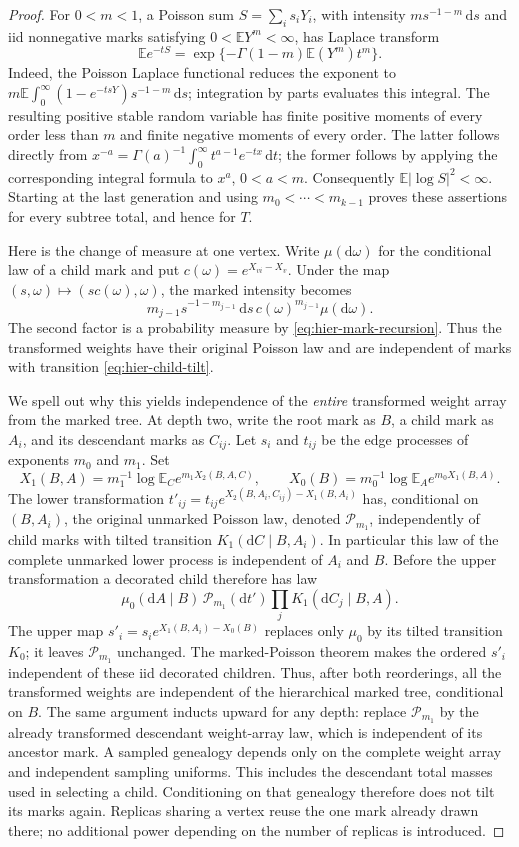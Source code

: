 \documentclass[11pt,a4paper]{article}
\numberwithin{equation}{section}
\theoremstyle{definition}
\theoremstyle{remark}
\newcommand{\E}{\mathbb E}
\newcommand{\dd}{\mathrm d}
\begin{document}
\begin{proof}
For $0<m<1$, a Poisson sum $S=\sum_i s_iY_i$, with intensity
$m s^{-1-m}\,\dd s$ and iid nonnegative marks satisfying
$0<\E Y^m<\infty$, has Laplace transform
\[
 \E e^{-tS}
 =\exp\{-\Gamma(1-m)\E(Y^m)t^m\}.
\]
Indeed, the Poisson Laplace functional reduces the exponent to
$m\E\int_0^\infty(1-e^{-tsY})s^{-1-m}\,\dd s$; integration by parts evaluates
this integral.  The resulting positive stable random variable has finite
positive moments of every order less than $m$ and finite negative moments
of every order.  The latter follows directly from
$x^{-a}=\Gamma(a)^{-1}\int_0^\infty t^{a-1}e^{-tx}\,\dd t$; the former follows
by applying the corresponding integral formula to $x^a$, $0<a<m$.
Consequently $\E|\log S|^2<\infty$.  Starting at the last generation and
using $m_0<\cdots<m_{k-1}$ proves these assertions for every subtree total,
and hence for $T$.

Here is the change of measure at one vertex.  Write $\mu(\dd\omega)$ for
the conditional law of a child mark and put $c(\omega)=e^{X_{vi}-X_v}$.
Under the map $(s,\omega)\mapsto(sc(\omega),\omega)$, the marked intensity
becomes
\[
 m_{j-1}s^{-1-m_{j-1}}\,\dd s\,
 c(\omega)^{m_{j-1}}\mu(\dd\omega).
\]
The second factor is a probability measure by
\eqref{eq:hier-mark-recursion}.  Thus the transformed weights have their
original Poisson law and are independent of marks with transition
\eqref{eq:hier-child-tilt}.

We spell out why this yields independence of the \emph{entire} transformed
weight array from the marked tree.  At depth two, write the root mark as
$B$, a child mark as $A_i$, and its descendant marks as $C_{ij}$.  Let $s_i$
and $t_{ij}$ be the edge processes of exponents $m_0$ and $m_1$.  Set
\[
 X_1(B,A)=m_1^{-1}\log\E_C e^{m_1X_2(B,A,C)},\qquad
 X_0(B)=m_0^{-1}\log\E_A e^{m_0X_1(B,A)}.
\]
The lower transformation
$t'_{ij}=t_{ij}e^{X_2(B,A_i,C_{ij})-X_1(B,A_i)}$ has, conditional on
$(B,A_i)$, the original unmarked Poisson law, denoted $\mathcal P_{m_1}$,
independently of child marks with tilted transition $K_1(\dd C\mid B,A_i)$.
In particular this law of the complete unmarked lower process is
independent of $A_i$ and $B$.  Before the upper transformation a decorated
child therefore has law
\[
 \mu_0(\dd A\mid B)\,\mathcal P_{m_1}(\dd t')
              \prod_jK_1(\dd C_j\mid B,A).
\]
The upper map $s'_i=s_i e^{X_1(B,A_i)-X_0(B)}$ replaces only $\mu_0$ by
its tilted transition $K_0$; it leaves $\mathcal P_{m_1}$ unchanged.
The marked-Poisson theorem makes the ordered $s'_i$ independent of these
iid decorated children.  Thus, after both reorderings, all the transformed
weights are independent of the hierarchical marked tree, conditional on
$B$.  The same argument inducts upward for any depth: replace
$\mathcal P_{m_1}$ by the already transformed descendant weight-array law,
which is independent of its ancestor mark.  A sampled genealogy depends
only on the complete weight array and independent sampling uniforms.  This
includes the descendant total masses used in selecting a child.
Conditioning on that genealogy therefore does not tilt its marks again.
Replicas sharing a vertex reuse the one mark already drawn there; no
additional power depending on the number of replicas is introduced.


\end{proof}
\end{document}
